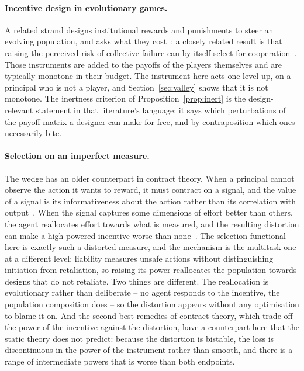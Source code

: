 \documentclass[11pt,a4paper]{article}
\theoremstyle{definition}
\begin{document}
\paragraph{Incentive design in evolutionary games.}
A related strand designs institutional rewards and punishments to steer an
evolving population, and asks what they cost~\citep{sigmund2010institutions,wang2019optimal}; a closely related
result is that raising the perceived risk of collective failure can by itself
select for cooperation~\citep{santos2011risk}. Those instruments are
added to the payoffs of the players themselves and are typically monotone in
their budget. The instrument here acts one level up, on a principal who is not
a player, and Section~\ref{sec:valley} shows that it is not monotone. The
inertness criterion of Proposition~\ref{prop:inert} is the design-relevant
statement in that literature's language: it says which perturbations of the
payoff matrix a designer can make for free, and by contraposition which ones
necessarily bite.

\paragraph{Selection on an imperfect measure.}
The wedge has an older counterpart in contract theory. When a principal cannot
observe the action it wants to reward, it must contract on a signal, and the
value of a signal is its informativeness about the action rather than its
correlation with output~\citep{holmstrom1979moral}. When the signal captures
some dimensions of effort better than others, the agent reallocates effort
towards what is measured, and the resulting distortion can make a
high-powered incentive worse than none~\citep{baker1992incentive,
holmstrom1991multitask}. The selection functional here is exactly such a
distorted measure, and the mechanism is the multitask one at a different
level: liability measures unsafe actions without distinguishing initiation
from retaliation, so raising its power reallocates the population towards
designs that do not retaliate. Two things are different. The reallocation is
evolutionary rather than deliberate -- no agent responds to the incentive, the
population composition does -- so the distortion appears without any
optimisation to blame it on. And the second-best remedies of contract theory,
which trade off the power of the incentive against the distortion, have a
counterpart here that the static theory does not predict: because the
distortion is bistable, the loss is discontinuous in the power of the
instrument rather than smooth, and there is a range of intermediate powers
that is worse than both endpoints.
\end{document}
